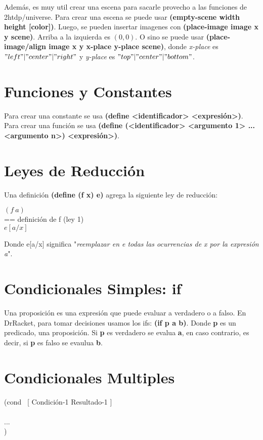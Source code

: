 \documentclass[11pt,a4paper]{article}
\begin{document}
\noindent Adem\'as, es muy util crear una escena para sacarle provecho a las funciones de 2htdp/universe. Para crear una escena se puede usar \textbf{(empty-scene width height [color])}. Luego, se pueden insertar imagenes con \textbf{(place-image image x y scene)}. Arriba a la izquierda es $(0,0)$. O sino se puede usar \textbf{(place-image/align image x y x-place y-place scene)}, donde \textit{x-place} es $"left"|"center"|"right"$ y \textit{y-place} es $"top"|"center"|"bottom"$.

\section{Funciones y Constantes}
\noindent Para crear una constante se usa \textbf{(define <identificador> <expresión>)}. Para crear una funci\'on se usa \textbf{(define (<identificador> <argumento 1> ... <argumento n>) <expresión>)}.

\section{Leyes de Reducci\'on}
\noindent Una definici\'on \textbf{(define (f x) e)} agrega la siguiente ley de reducci\'on:
\begin{siderules}
$(f\ a)$\\
== definición de f (ley 1)\\
$e[a/x]$
\end{siderules}
Donde e[a/x] significa "\textit{reemplazar en e todas las ocurrencias de x por la expresión a}".

\section{Condicionales Simples: if}
Una proposición es una expresión que puede evaluar a verdadero o a falso. En DrRacket, para tomar decisiones usamos los ifs: \textbf{(if p a b)}. Donde \textbf{p} es un predicado, una proposición. Si \textbf{p} es verdadero se evalua \textbf{a}, en caso contrario, es decir, si \textbf{p} es falso se evaulua \textbf{b}.

\section{Condicionales Multiples}
\begin{siderules}
\noindent (cond  \ [ Condición-1 Resultado-1 ]\\
\indent {}\\
\indent \indent ...\\
\indent {})
\end{siderules}
\end{document}
